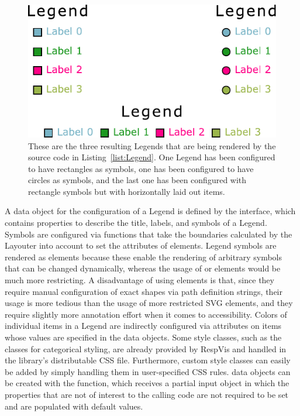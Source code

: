 \begin{figure}[tp]
\centering
\includegraphics[keepaspectratio,width=\linewidth / 2,height=\fullh]{diagrams/legend.pdf}
\caption[Legend Example]{
  These are the three resulting Legends that are being rendered by the source code in Listing~\ref{list:Legend}.
  One Legend has been configured to have rectangles as symbols, one has been configured to have circles as symbols, and the last one has been configured with rectangle symbols but with horizontally laid out items.
}
\label{fig:Legend}
\end{figure}

A data object for the configuration of a Legend is defined by the  interface, which contains properties to describe the title, labels, and symbols of a Legend.
Symbols are configured via functions that take the boundaries calculated by the Layouter into account to set the  attributes of  elements.
Legend symbols are rendered as  elements because these enable the rendering of arbitrary symbols that can be changed dynamically, whereas the usage of  or  elements would be much more restricting.
A disadvantage of using  elements is that, since they require manual configuration of exact shapes via path definition strings, their usage is more tedious than the usage of more restricted SVG elements, and they require slightly more annotation effort when it comes to accessibility.
Colors of individual items in a Legend are indirectly configured via  attributes on items whose values are specified in the  data objects.
Some style classes, such as the  classes for categorical styling, are already provided by RespVis and handled in the library's distributable CSS file.
Furthermore, custom style classes can easily be added by simply handling them in user-specified CSS rules.
 data objects can be created with the  function, which receives a partial input object in which the properties that are not of interest to the calling code are not required to be set and are populated with default values.

